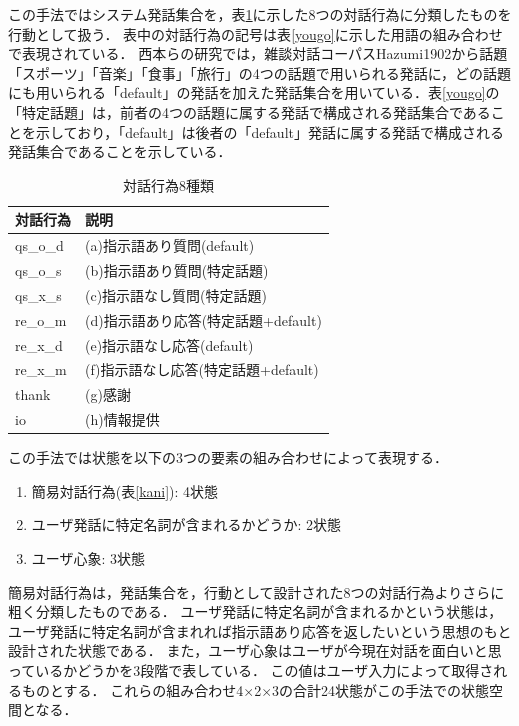 \documentclass[12pt,a4paper,twoside,openany]{jbook}
\begin{document}

この手法ではシステム発話集合を，表\ref{taiwakoui}に示した8つの対話行為に分類したものを行動として扱う．
表中の対話行為の記号は表\ref{yougo}に示した用語の組み合わせで表現されている．
西本らの研究では，雑談対話コーパスHazumi1902\cite{hazumi}から話題「スポーツ」「音楽」「食事」「旅行」の4つの話題で用いられる発話に，どの話題にも用いられる「default」の発話を加えた発話集合を用いている．表\ref{yougo}の「特定話題」は，前者の4つの話題に属する発話で構成される発話集合であることを示しており，「default」は後者の「default」発話に属する発話で構成される発話集合であることを示している．
\begin{table}[tb]
    \caption{対話行為8種類}\label{taiwakoui}
    \centering
    \begin{tabular}{|l|l|}\hline 
         対話行為&説明  \\ \hline \hline
         qs\_o\_d&(a)指示語あり質問(default) \\ \hline
         qs\_o\_s&(b)指示語あり質問(特定話題) \\ \hline
         qs\_x\_s&(c)指示語なし質問(特定話題) \\ \hline
         re\_o\_m&(d)指示語あり応答(特定話題+default) \\ \hline
         re\_x\_d&(e)指示語なし応答(default) \\ \hline
         re\_x\_m&(f)指示語なし応答(特定話題+default) \\ \hline
         thank&(g)感謝 \\ \hline
         io&(h)情報提供 \\ \hline
    \end{tabular}
\end{table}

この手法では状態を以下の3つの要素の組み合わせによって表現する．
\begin{enumerate}
\item 簡易対話行為(表\ref{kani}): 4状態
\item ユーザ発話に特定名詞が含まれるかどうか: 2状態
\item ユーザ心象: 3状態
\end{enumerate}
簡易対話行為は，発話集合を，行動として設計された8つの対話行為よりさらに粗く分類したものである．
ユーザ発話に特定名詞が含まれるかという状態は，ユーザ発話に特定名詞が含まれれば指示語あり応答を返したいという思想のもと設計された状態である．
また，ユーザ心象はユーザが今現在対話を面白いと思っているかどうかを3段階で表している．
この値はユーザ入力によって取得されるものとする．
これらの組み合わせ4$\times$2$\times$3の合計24状態がこの手法での状態空間となる．
\end{document}
